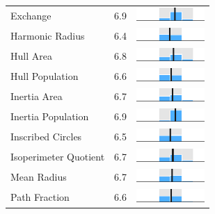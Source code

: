 \begin{table}
\begin{tabular}{l rm{7em}}
Exchange               &   6.9 &     \includegraphics[width=7em]{mini_hist/VA_2016_exchange} \\
Harmonic Radius        &   6.4 &  \includegraphics[width=7em]{mini_hist/VA_2016_harm_radius} \\
Hull Area              &   6.8 &       \includegraphics[width=7em]{mini_hist/VA_2016_hull_a} \\
Hull Population        &   6.6 &       \includegraphics[width=7em]{mini_hist/VA_2016_hull_p} \\
Inertia Area           &   6.7 &    \includegraphics[width=7em]{mini_hist/VA_2016_inertia_a} \\
Inertia Population     &   6.9 &    \includegraphics[width=7em]{mini_hist/VA_2016_inertia_p} \\
Inscribed Circles      &   6.5 &    \includegraphics[width=7em]{mini_hist/VA_2016_ehrenburg} \\
Isoperimeter Quotient  &   6.7 &       \includegraphics[width=7em]{mini_hist/VA_2016_polsby} \\
Mean Radius            &   6.7 &  \includegraphics[width=7em]{mini_hist/VA_2016_mean_radius} \\
Path Fraction          &   6.6 &    \includegraphics[width=7em]{mini_hist/VA_2016_path_frac} \\

\end{tabular}
\end{table}
